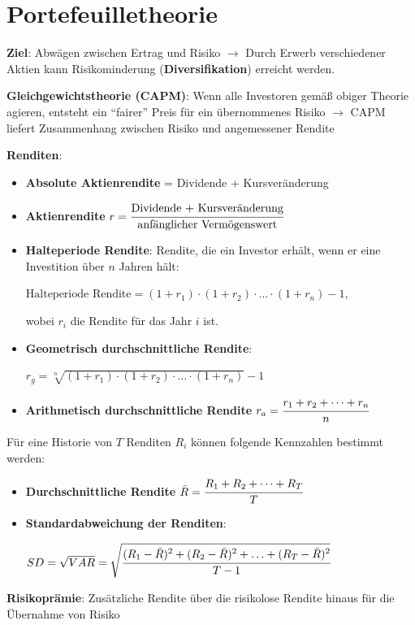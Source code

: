 \section{Portefeuilletheorie}

\textbf{Ziel}: Abwägen zwischen Ertrag und Risiko 
$\rightarrow$ Durch Erwerb verschiedener Aktien kann Risikominderung (\textbf{Diversifikation}) erreicht werden.

\textbf{Gleichgewichtstheorie (CAPM)}: Wenn alle Investoren gemäß obiger Theorie agieren, entsteht ein \enquote{fairer} Preis für ein übernommenes Risiko $\rightarrow$ CAPM liefert Zusammenhang zwischen Risiko und angemessener Rendite

\textbf{Renditen}:
\begin{itemize}
	\item \textbf{Absolute Aktienrendite} = Dividende + Kursveränderung
	\item \textbf{Aktienrendite} $r = \cfrac{\text{Dividende + Kursveränderung}}{\text{anfänglicher Vermögenswert}}$
\pagebreak
	\item \textbf{Halteperiode Rendite}: Rendite, die ein Investor erhält, wenn er eine Investition
	über $n$ Jahren hält:
	\begin{center}
		$\text{Halteperiode Rendite}=(1+r_1)\cdot(1+r_2)\cdot\ldots\cdot(1+r_n)-1$,
	\end{center}
	wobei $r_i$ die Rendite für das Jahr $i$ ist.
	\item \textbf{Geometrisch durchschnittliche Rendite}:
	\begin{center}
		 $r_g=\sqrt[n]{(1+r_1)\cdot(1+r_2)\cdot\ldots\cdot(1+r_n)}-1$
	\end{center}
	\item \textbf{Arithmetisch durchschnittliche Rendite} $r_a=\cfrac{r_1+r_2+\dots+r_n}{n}$
\end{itemize}
Für eine Historie von $T$ Renditen $R_i$ können folgende Kennzahlen bestimmt werden:
\begin{itemize}
	\item \textbf{Durchschnittliche Rendite} $\bar{R}=\cfrac{R_1+R_2+\dots+R_T}{T}$
	\item \textbf{Standardabweichung der Renditen}:
	\begin{center}
		$SD=\sqrt{VAR}=\sqrt{\cfrac{(R_1-\bar{R})^2+(R_2-\bar{R})^2+\ldots+(R_T-\bar{R})^2}{T-1}}$
	\end{center}
\end{itemize}

\textbf{Risikoprämie}: Zusätzliche Rendite über die risikolose Rendite hinaus für die Übernahme von Risiko\\

